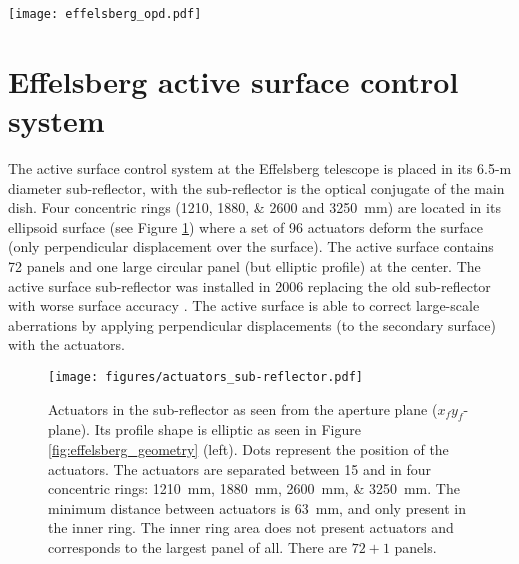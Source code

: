 \documentclass[
    ]
    {aa}
\begin{document}
\begin{appendix}
        \begin{figure*}
            \centering
            \texttt{[image: effelsberg\_opd.pdf]}
            \caption{OPD function in a Gregorian telescope. Graphical description of the calculation of the OPD function, $\delta(x, y; d_z)$. The red light ray is in-focus and the orange is out-of-focus, given a certain radial offset, $d_z$. Blue lines and circles are zoom-in sections. Top right dashed line represents the sub-reflector offset in the $z_f$-axis. The diagram on the left-hand side corresponds to the primary reflector and its radial defocus. The right-hand side image is the continuation of the same light ray, $A$, reflected on the primary reflector, that reaches the second focus of the ellipse. The radial offset is the same for both foci. The angle $\gamma_2$ exists between the points $p_2$-$g$-$p_2'$.}
            \label{fig:effelsberg_opd}
        \end{figure*}

        \section{Effelsberg active surface control system}
        \label{ap:effelsberg_active_surface_control_system}

        The active surface control system at the Effelsberg telescope is placed in its 6.5-m diameter sub-reflector, with the sub-reflector is the optical conjugate of the main dish. Four concentric rings (\numlist[list-final-separator={, }]{1210;1880;2600} and \SI{3250}{\mm}) are located in its ellipsoid surface (see Figure \ref{fig:actuators_sub-reflector}) where a set of 96 actuators deform the surface (only perpendicular displacement over the surface). The active surface contains \num{72} panels and one large circular panel (but elliptic profile) at the center.
        The active surface sub-reflector was installed in 2006 replacing the old sub-reflector with worse surface accuracy \citep{Bach:2007wu}.
        The active surface is able to correct large-scale aberrations by applying perpendicular displacements (to the secondary surface) with the actuators.

        \begin{figure}[h]
            \centering
            \texttt{[image: figures/actuators\_sub-reflector.pdf]}
            \caption{Actuators in the sub-reflector as seen from the aperture plane ($x_fy_f$-plane). Its profile shape is elliptic as seen in Figure \ref{fig:effelsberg_geometry} (left). Dots represent the position of the actuators. The actuators are separated between \SI{15}{\deg} and in four concentric rings: \SIlist{1210;1880;2600;3250}{\mm}. The minimum distance between actuators is \SI{63}{\mm}, and only present in the inner ring. The inner ring area does not present actuators and corresponds to the largest panel of all. There are $\num{72} + \num{1}$ panels.}
            \label{fig:actuators_sub-reflector}
        \end{figure}


\end{appendix}
\end{document}
